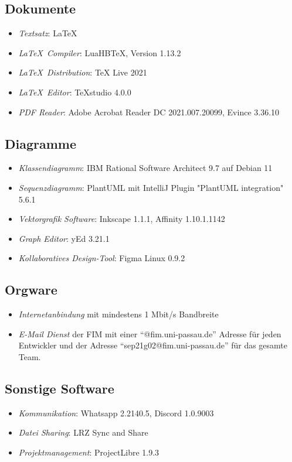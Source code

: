 \subsection{Dokumente}
\begin{itemize}
	\item \emph{Textsatz}: \LaTeX
	\item \emph{\LaTeX\ Compiler}: LuaHBTeX, Version 1.13.2
	\item \emph{\LaTeX\ Distribution}: TeX Live 2021
	\item \emph{\LaTeX\ Editor}: TeXstudio 4.0.0
	\item \emph{PDF Reader}: Adobe Acrobat Reader DC 2021.007.20099, Evince 3.36.10
\end{itemize}
\subsection{Diagramme}
\begin{itemize}
	\item \emph{Klassendiagramm}: IBM Rational Software Architect 9.7 auf Debian 11
	\item \emph{Sequenzdiagramm}: PlantUML mit IntelliJ Plugin "PlantUML integration" 5.6.1
	\item \emph{Vektorgrafik Software}: Inkscape 1.1.1, Affinity 1.10.1.1142
	\item \emph{Graph Editor}: yEd 3.21.1
	\item \emph{Kollaboratives Design-Tool}: Figma Linux 0.9.2
\end{itemize}
\subsection{Orgware}
\begin{itemize}
	\item \emph{Internetanbindung} mit mindestens 1 Mbit/s Bandbreite
	\item \emph{E-Mail Dienst} der FIM mit einer ``@fim.uni-passau.de'' Adresse für jeden Entwickler und der Adresse ``sep21g02@fim.uni-passau.de'' für das gesamte Team.
\end{itemize}
\subsection{Sonstige Software}
\begin{itemize}
	\item \emph{Kommunikation}: Whatsapp 2.2140.5, Discord 1.0.9003
	\item \emph{Datei Sharing}: LRZ Sync and Share
	\item \emph{Projektmanagement}: ProjectLibre 1.9.3
\end{itemize}